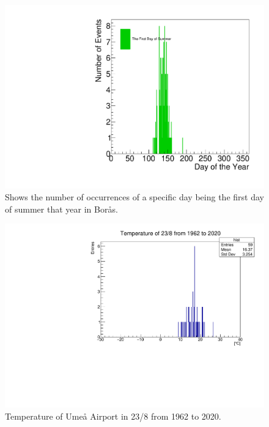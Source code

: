 \documentclass[a4, 12pt]{article}
\begin{document}
\begin{figure}[H]
\centering
\includegraphics[scale=0.50]{philipSummer.pdf}
\caption{Shows the number of occurrences of a specific day being the first day of summer that year in Borås.}
\end{figure}
\newpage




\begin{figure}[H]
\centering
\includegraphics[scale=0.6]{chrisFig1.pdf}
\caption{Temperature of Umeå Airport in 23/8 from 1962 to 2020.}
\end{figure}
\end{document}
